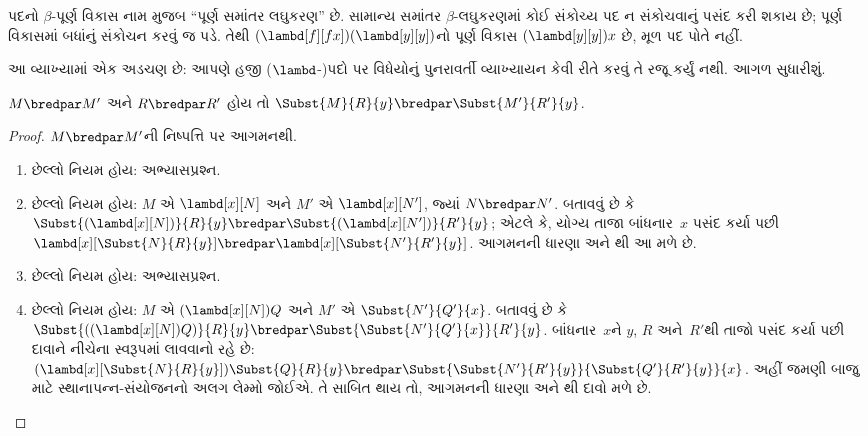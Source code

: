 પદનો $\beta$-પૂર્ણ વિકાસ નામ મુજબ ``પૂર્ણ સમાંતર
લઘુકરણ'' છે. સામાન્ય સમાંતર $\beta$-લઘુકરણમાં કોઈ
સંકોચ્ય પદ ન સંકોચવાનું પસંદ કરી શકાય છે; પૂર્ણ વિકાસમાં
બધાંનું સંકોચન કરવું જ પડે. તેથી
$(\lambd[f][fx])(\lambd[y][y])$નો પૂર્ણ વિકાસ
$(\lambd[y][y])x$ છે, મૂળ પદ પોતે નહીં.

\begin{editorial}
  આ વ્યાખ્યામાં એક અડચણ છે: આપણે હજી
  ($\lambd$-)પદો પર વિધેયોનું પુનરાવર્તી વ્યાખ્યાયન
  કેવી રીતે કરવું તે રજૂ કર્યું નથી. આગળ સુધારીશું.
\end{editorial}

\begin{lem}
  $M \bredpar M'$ અને $R \bredpar R'$ હોય તો
  $\Subst{M}{R}{y} \bredpar
  \Subst{M'}{R'}{y}$.
\end{lem}

\begin{proof}
  $M \bredpar M'$ની નિષ્પત્તિ પર આગમનથી.
  \begin{enumerate}
    \item છેલ્લો નિયમ  હોય: અભ્યાસપ્રશ્ન.
    \item છેલ્લો નિયમ  હોય:
      $M$ એ $\lambd[x][N]$ અને $M'$ એ $\lambd[x][N']$,
      જ્યાં $N \bredpar N'$. બતાવવું છે કે
      $\Subst{(\lambd[x][N])}{R}{y} \bredpar
      \Subst{(\lambd[x][N'])}{R'}{y}$; એટલે કે,
      યોગ્ય તાજા બાંધનાર~$x$ પસંદ કર્યા પછી
      $\lambd[x][\Subst{N}{R}{y}] \bredpar
      \lambd[x][\Subst{N'}{R'}{y}]$.
      આગમનની ધારણા અને થી આ મળે છે.
    \item છેલ્લો નિયમ  હોય: અભ્યાસપ્રશ્ન.
    \item છેલ્લો નિયમ  હોય:
      $M$ એ $(\lambd[x][N])Q$ અને
      $M'$ એ $\Subst{N'}{Q'}{x}$. બતાવવું છે કે
      $\Subst{((\lambd[x][N])Q)}{R}{y} \bredpar
      \Subst{\Subst{N'}{Q'}{x}}{R'}{y}$.
      બાંધનાર~$x$ને $y$, $R$ અને~$R'$થી તાજો
      પસંદ કર્યા પછી દાવાને નીચેના સ્વરૂપમાં લાવવાનો રહે છે:
      $(\lambd[x][\Subst{N}{R}{y}])\Subst{Q}{R}{y} \bredpar
      \Subst{\Subst{N'}{R'}{y}}{\Subst{Q'}{R'}{y}}{x}$.
      અહીં જમણી બાજુ માટે સ્થાનાપન્ન-સંયોજનનો
      અલગ લેમ્મો જોઈએ. તે સાબિત થાય તો, આગમનની ધારણા અને
      થી દાવો મળે છે.
  \end{enumerate}
\end{proof}

